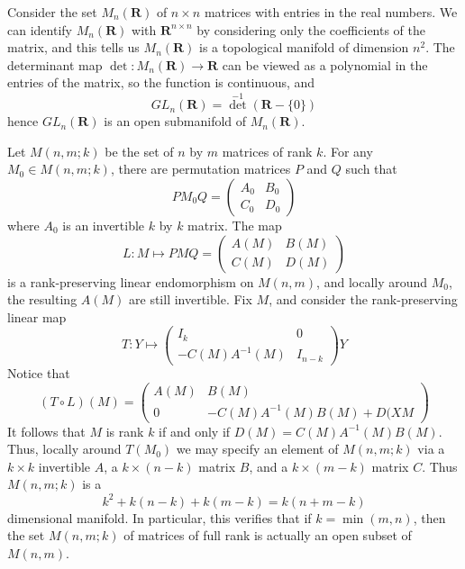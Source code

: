 \begin{example}
    Consider the set $M_n(\mathbf{R})$ of $n \times n$ matrices with entries in the real numbers. We can identify $M_n(\mathbf{R})$ with $\mathbf{R}^{n \times n}$ by considering only the coefficients of the matrix, and this tells us $M_n(\mathbf{R})$ is a topological manifold of dimension $n^2$. The determinant map $\det:M_n(\mathbf{R}) \to \mathbf{R}$ can be viewed as a polynomial in the entries of the matrix, so the function is continuous, and
    \[ GL_n(\mathbf{R}) = {\det}^{-1}(\mathbf{R} - \{0\}) \]
    hence $GL_n(\mathbf{R})$ is an open submanifold of $M_n(\mathbf{R})$.
\end{example}

\begin{example}
    Let $M(n,m;k)$ be the set of $n$ by $m$ matrices of rank $k$. For any $M_0 \in M(n,m;k)$, there are permutation matrices $P$ and $Q$ such that
    \[ PM_0Q = \begin{pmatrix} A_0 & B_0 \\ C_0 & D_0 \end{pmatrix} \]
    where $A_0$ is an invertible $k$ by $k$ matrix. The map
    \[ L: M \mapsto PMQ = \begin{pmatrix} A(M) & B(M) \\ C(M) & D(M) \end{pmatrix} \]
    is a rank-preserving linear endomorphism on $M(n,m)$, and locally around $M_0$, the resulting $A(M)$ are still invertible. Fix $M$, and consider the rank-preserving linear map
    \[ T: Y \mapsto \begin{pmatrix} I_k & 0 \\ -C(M)A^{-1}(M) & I_{n-k} \end{pmatrix} Y \]
    Notice that
    \[ (T \circ L)(M) = \begin{pmatrix} A(M) & B(M) \\ 0 & -C(M)A^{-1}(M)B(M) + D(XM \end{pmatrix} \]
    It follows that $M$ is rank $k$ if and only if $D(M) = C(M)A^{-1}(M)B(M)$. Thus, locally around $T(M_0)$ we may specify an element of $M(n,m;k)$ via a $k \times k$ invertible $A$, a $k \times (n - k)$ matrix $B$, and a $k \times (m - k)$ matrix $C$. Thus $M(n,m;k)$ is a
    \[ k^2 + k(n-k) + k(m-k) = k(n + m - k) \]
    dimensional manifold. In particular, this verifies that if $k = \min(m,n)$, then the set $M(n,m;k)$ of matrices of full rank is actually an open subset of $M(n,m)$.
\end{example}


